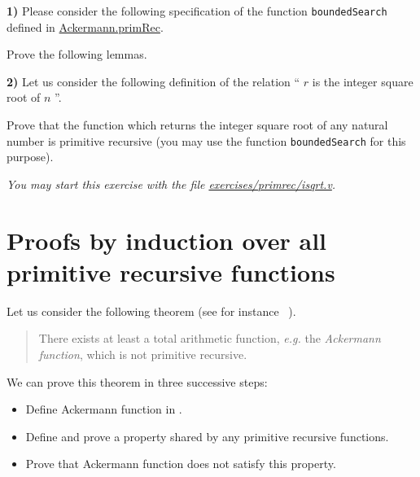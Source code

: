 \begin{exercise}

\mbox{}
\vspace{4pt}

\noindent
 \textbf{1)} 
Please consider the following specification of the function \texttt{boundedSearch} defined in 
\href{../theories/html/hydras.Ackermann.primRec.html}{Ackermann.primRec}.


Prove the following lemmas.


\noindent
\textbf{2)} 
Let us consider the following definition of the relation `` $r$ is the integer square root of $n$ ''.


Prove that the function which returns the  integer square root of any natural number  is primitive recursive (you may use 
the function \texttt{boundedSearch} for this purpose).

\emph{You may start this exercise with the file
    \href{https://github.com/coq-community/hydra-battles/blob/master/exercises/primrec/isqrt.v}{exercises/primrec/isqrt.v}.}

\end{exercise}

\section{Proofs by induction over all primitive recursive functions}

Let us consider the following theorem (see for instance ~\cite{planetmath}).

\begin{quote}
   There exists at least a total arithmetic function, \emph{e.g.} the \emph{Ackermann function},  which is not primitive recursive.
\end{quote}

We can prove this theorem in three successive steps:

\begin{itemize}
\item Define Ackermann function in \gallina.
\item Define and prove a property shared by any primitive recursive functions.
\item Prove that  Ackermann function does not satisfy this property.
\end{itemize}


